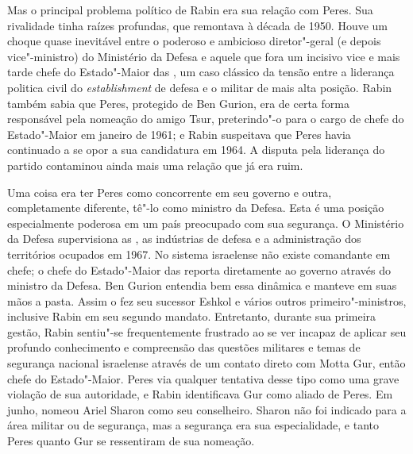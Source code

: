 Mas o principal problema político de Rabin era sua relação com Peres.
Sua rivalidade tinha raízes profundas, que remontava à década de 1950.
Houve um choque quase inevitável entre o poderoso e ambicioso diretor"-geral
(e depois vice"-ministro) do Ministério da Defesa e aquele que fora um incisivo
vice e mais tarde chefe do Estado"-Maior das , um caso clássico da
tensão entre a liderança politica civil do \emph{establishment} de
defesa e o militar de mais alta posição. Rabin também sabia que Peres,
protegido de Ben Gurion, era de certa forma responsável pela nomeação do
amigo Tsur, preterindo"-o para o cargo de chefe do Estado"-Maior em
janeiro de 1961; e Rabin suspeitava que Peres havia continuado a se opor
a sua candidatura em 1964. A disputa pela liderança do partido
contaminou ainda mais uma relação que já era ruim.

Uma coisa era ter Peres como concorrente em seu governo e outra,
completamente diferente, tê"-lo como ministro da Defesa. Esta é uma
posição especialmente poderosa em um país preocupado com sua segurança.
O Ministério da Defesa supervisiona as , as indústrias de defesa e a
administração dos territórios ocupados em 1967. No sistema israelense
não existe comandante em chefe; o chefe do Estado"-Maior das  reporta
diretamente ao governo através do ministro da Defesa. Ben Gurion
entendia bem essa dinâmica e manteve em suas mãos a pasta.
Assim o fez seu sucessor Eshkol e vários outros primeiro"-ministros,
inclusive Rabin em seu segundo mandato. Entretanto, durante sua primeira gestão,
Rabin sentiu"-se frequentemente frustrado ao se ver incapaz de aplicar
seu profundo conhecimento e compreensão das questões militares e temas
de segurança nacional israelense através de um contato direto com Motta
Gur, então chefe do Estado"-Maior. Peres via qualquer tentativa desse
tipo como uma grave violação de sua autoridade, e Rabin identificava Gur
como aliado de Peres. Em junho, nomeou Ariel Sharon como seu
conselheiro. Sharon não foi indicado para a área militar ou de segurança,
mas a segurança era sua especialidade, e tanto Peres quanto Gur se
ressentiram de sua nomeação.

